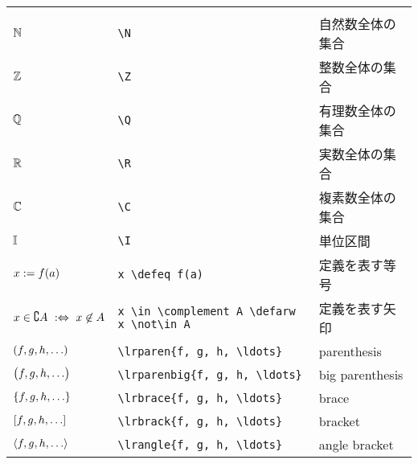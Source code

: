 \documentclass[uplatex, dvipdfmx, 12pt, crop=false]{standalone}
\begin{document}
\begin{table}[htb]
\begin{tabular}{ll@{\qquad}l}
		\tablesubtitle{基礎的な数式記号} \\
		$\mathbb{N}$                                      & \verb|\N|                                                                        & 自然数全体の集合                   \\
		$\mathbb{Z}$                                      & \verb|\Z|                                                                        & 整数全体の集合                     \\
		$\mathbb{Q}$                                      & \verb|\Q|                                                                        & 有理数全体の集合                   \\
		$\mathbb{R}$                                      & \verb|\R|                                                                        & 実数全体の集合                     \\
		$\mathbb{C}$                                      & \verb|\C|                                                                        & 複素数全体の集合                   \\
		$\mathbb{I}$                                      & \verb|\I|                                                                        & 単位区間                           \\
		$x \mathrel{:=} f(a)$                           & \verb|x \defeq f(a)|                                                             & 定義を表す等号                     \\
		$x \in \complement A \mathrel{\ :\Leftrightarrow\ } x \not\in A$ & \verb|x \in \complement A \defarw x \not\in A|                                   & 定義を表す矢印                     \\
		$\lrparen{f, g, h, \ldots}$               & \verb|\lrparen{f, g, h, \ldots}|                                                 & parenthesis                        \\
		$\bigl({f, g, h, \ldots}\bigr)$            & \verb|\lrparenbig{f, g, h, \ldots}|                                              & big parenthesis                    \\
		$\lrbrace{f, g, h, \ldots}$               & \verb|\lrbrace{f, g, h, \ldots}|                                                 & brace                              \\
		$\lrbrack{f, g, h, \ldots}$               & \verb|\lrbrack{f, g, h, \ldots}|                                                 & bracket                            \\
		$\lrangle{f, g, h, \ldots}$               & \verb|\lrangle{f, g, h, \ldots}|                                                 & angle bracket                      \\

\end{tabular}
\end{table}
\end{document}
